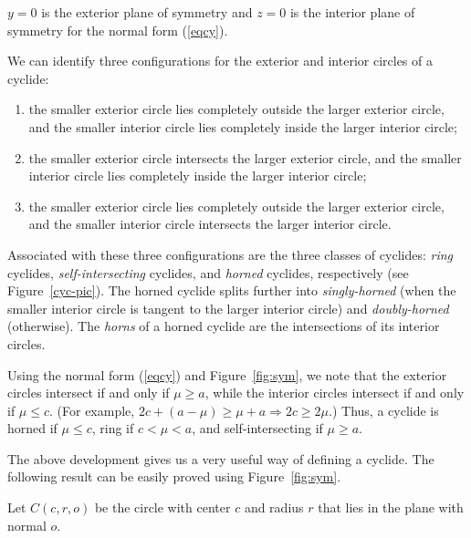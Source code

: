 \begin{rmk}
$y=0$ is the exterior plane of symmetry and 
$z=0$ is the interior plane of symmetry for the normal form (\ref{eqcy}).
\end{rmk}

We can identify three configurations for the
exterior and interior circles of a cyclide:
\begin{enumerate}
\item
	the smaller exterior circle lies completely outside the larger exterior
	circle, and the smaller interior circle lies completely inside the
	larger interior circle;
\item
	the smaller exterior circle intersects the larger exterior circle,
	and the smaller interior circle lies completely inside the
	larger interior circle;
\item
	the smaller exterior circle lies completely outside the larger exterior
	circle, and the smaller interior circle intersects the
	larger interior circle.
\end{enumerate}

Associated with these three configurations are the three classes of cyclides:
{\em ring} cyclides, {\em self-intersecting} 
cyclides, and {\em horned} cyclides, respectively (see Figure~\ref{cyc-pic}).
The horned cyclide splits further into {\em singly-horned}
(when the smaller interior circle is tangent to the 
larger interior circle) and {\em doubly-horned} (otherwise).
The {\em horns} of a horned cyclide are the intersections of its interior
circles.

\begin{rmk}
\label{rmk:rel}
Using the normal form (\ref{eqcy}) and Figure~\ref{fig:sym},
we note that the exterior circles intersect if and only if $\mu \geq a$,
while the interior circles intersect if and only if $\mu \leq c$.
(For example, $2c + (a-\mu) \geq \mu+a \Rightarrow 2c \geq 2\mu$.)
Thus, a cyclide is horned if $\mu \leq c$, ring if $c < \mu < a$, 
and self-intersecting if $\mu \geq a$.
\end{rmk}

The above development gives us a very useful way of defining a cyclide.
The following result can be easily proved using Figure~\ref{fig:sym}.

\begin{notation}
Let $C(c,r,o)$ be the circle with center $c$ and radius $r$
that lies in the plane with normal $o$.
\end{notation}

